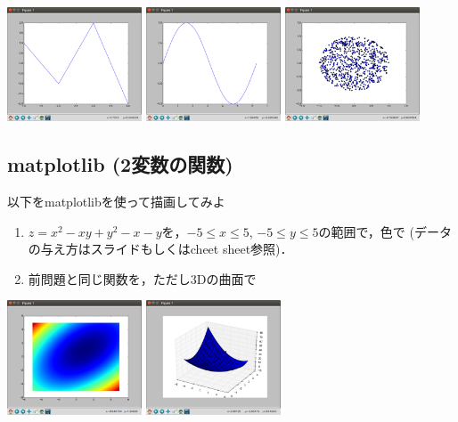 \documentclass[10pt,dvipdfmx]{article}
\begin{document}
\begin{center}
\includegraphics[width=0.3\textwidth]{out/pdf/img/plot_practice.pdf}
\includegraphics[width=0.3\textwidth]{out/pdf/img/sin.pdf}
\includegraphics[width=0.3\textwidth]{out/pdf/img/scatter_disc.pdf}
\end{center}

\subsection{{\scriptsize matplotlib (2変数の関数)}}
以下をmatplotlibを使って描画してみよ
\begin{enumerate}
\item $z = x^2 - xy + y^2 - x - y$を，$-5\leq x \leq 5$, 
$-5\leq y \leq 5$の範囲で，色で
{\small (データの与え方はスライドもしくはcheet sheet参照)}．
\item 前問題と同じ関数を，ただし3Dの曲面で
\end{enumerate}
\begin{center}
\includegraphics[width=0.3\textwidth]{out/pdf/img/xx_pcolor.pdf}
\includegraphics[width=0.3\textwidth]{out/pdf/img/xx_surface.pdf}
\end{center}
\end{document}
